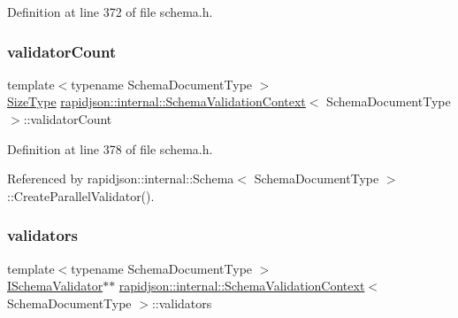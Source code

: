 Definition at line 372 of file schema.\+h.

\mbox{\label{structrapidjson_1_1internal_1_1_schema_validation_context_af0b50fe8a859345d00a95f35f49da6a2}} 
\subsubsection{\texorpdfstring{validatorCount}{validatorCount}}
{\footnotesize\ttfamily template$<$typename Schema\+Document\+Type $>$ \\
\mbox{\hyperlink{namespacerapidjson_a44eb33eaa523e36d466b1ced64b85c84}{Size\+Type}} \mbox{\hyperlink{structrapidjson_1_1internal_1_1_schema_validation_context}{rapidjson\+::internal\+::\+Schema\+Validation\+Context}}$<$ Schema\+Document\+Type $>$\+::validator\+Count}



Definition at line 378 of file schema.\+h.



Referenced by rapidjson\+::internal\+::\+Schema$<$ Schema\+Document\+Type $>$\+::\+Create\+Parallel\+Validator().

\mbox{\label{structrapidjson_1_1internal_1_1_schema_validation_context_af81c4efa8d41dd9608d5bd23075bac4a}} 
\subsubsection{\texorpdfstring{validators}{validators}}
{\footnotesize\ttfamily template$<$typename Schema\+Document\+Type $>$ \\
\mbox{\hyperlink{classrapidjson_1_1internal_1_1_i_schema_validator}{I\+Schema\+Validator}}$\ast$$\ast$ \mbox{\hyperlink{structrapidjson_1_1internal_1_1_schema_validation_context}{rapidjson\+::internal\+::\+Schema\+Validation\+Context}}$<$ Schema\+Document\+Type $>$\+::validators}



